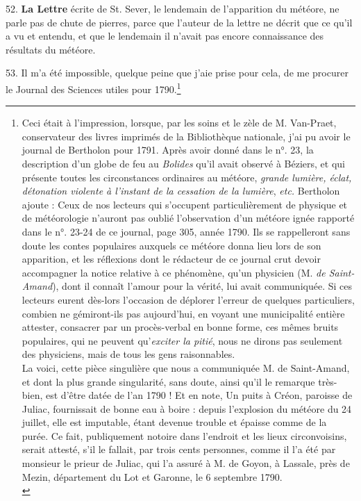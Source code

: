 \documentclass[a4paper, 11pt, oneside, polutonikogreek, french]{article}
\begin{document}
52. \textbf{La Lettre} écrite de St. Sever, le lendemain de l'apparition du météore, ne parle pas de chute de pierres, parce que l'auteur de la lettre ne décrit que ce qu'il a vu et entendu, et que le lendemain il n'avait pas encore connaissance des résultats du météore.

53. Il m'a été impossible, quelque peine que j'aie prise pour cela, de me procurer le Journal des Sciences utiles pour 1790.\footnote{Ceci était à l'impression, lorsque, par les soins et le zèle de M. Van-Praet, conservateur des livres imprimés de la Bibliothèque nationale, j'ai pu avoir le journal de Bertholon pour 1791. Après avoir donné dans le n°. 23, la description d'un globe de feu au \emph{Bolides} qu'il avait observé à Béziers, et qui présente toutes les circonstances ordinaires au météore, \emph{grande lumière, éclat, détonation violente à l'instant de la cessation de la lumière}, \emph{etc.} Bertholon ajoute : \og Ceux de nos lecteurs qui s'occupent particulièrement de physique et de météorologie n'auront pas oublié l'observation d'un météore ignée rapporté dans le n°. 23-24 de ce journal, page 305, année 1790. Ils se rappelleront sans doute les contes populaires auxquels ce météore donna lieu lors de son apparition, et les réflexions dont le rédacteur de ce journal crut devoir accompagner la notice relative à ce phénomène, qu'un physicien (M. \emph{de Saint-Amand}), dont il connaît l'amour pour la vérité, lui avait communiquée. Si ces lecteurs eurent dès-lors l'occasion de déplorer l'erreur de quelques particuliers, combien ne gémiront-ils pas aujourd'hui, en voyant une municipalité entière attester, consacrer par un procès-verbal en bonne forme, ces mêmes bruits populaires, qui ne peuvent qu'\emph{exciter la pitié}, nous ne dirons pas seulement des physiciens, mais de tous les gens raisonnables. \fg \\
\hspace*{5mm}\og La voici, cette pièce singulière que nous a communiquée M. de Saint-Amand, et dont la plus grande singularité, sans doute, ainsi qu'il le remarque très-bien, est d'être datée de l'an 1790 !  Et en note, \og Un puits à Créon, paroisse de Juliac, fournissait de bonne eau à boire : depuis l'explosion du météore du 24 juillet, elle est imputable, étant devenue trouble et épaisse comme de la purée. Ce fait, publiquement notoire dans l'endroit et les lieux circonvoisins, serait attesté, s'il le fallait, par trois cents personnes, comme il l'a été par monsieur le prieur de Juliac, qui l'a assuré à M. de Goyon, à Lassale, près de Mezin, département du Lot et Garonne, le 6 septembre 1790. \fg \\
}
\end{document}
